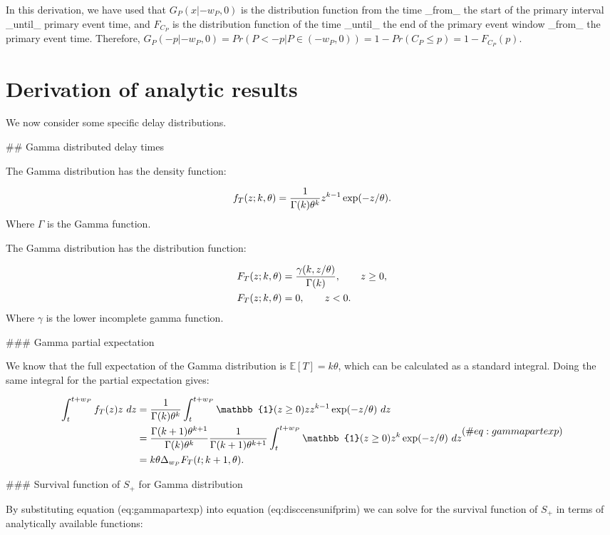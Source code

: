 \documentclass[10pt,letterpaper]{article}
\begin{document}
In this derivation, we have used that $G_P(x|-w_P, 0)$ is the distribution function from the time _from_ the start of the primary interval _until_ primary event time, and $F_{C_P}$ is the distribution function of the time _until_ the end of the primary event window _from_ the primary event time. Therefore, $G_P(-p|-w_P, 0) = Pr(P < -p | P \in (-w_P, 0)) = 1 - Pr(C_P \leq p) = 1 - F_{C_P}(p)$.

\section{Derivation of analytic results}

We now consider some specific delay distributions.

## Gamma distributed delay times

The Gamma distribution has the density function:

$$
f_T(z;k, \theta) = {1 \over \Gamma(k) \theta^k} z^{k-1} \exp(-z/\theta).
$$
Where $\Gamma$ is the Gamma function.

The Gamma distribution has the distribution function:

$$
\begin{aligned}
F_T(z;k, \theta) &= {\gamma(k, z/\theta) \over \Gamma(k)}, \qquad z\geq 0,\\
F_T(z;k, \theta) &= 0, \qquad z < 0.
\end{aligned}
$$
Where $\gamma$ is the lower incomplete gamma function.

### Gamma partial expectation

We know that the full expectation of the Gamma distribution is $\mathbb{E}[T] = k\theta$, which can be calculated as a standard integral. Doing the same integral for the partial expectation gives:

$$
\begin{aligned}
\int_t^{t+w_P} f_T(z) z~ dz &= {1 \over \Gamma(k) \theta^k} \int_t^{t+w_P} \mathbb{1}(z \geq 0)  z  z^{k-1} \exp(-z/\theta)~dz \\
&=  {\Gamma(k+1) \theta^{k+1} \over \Gamma(k) \theta^k}  {1 \over \Gamma(k+1) \theta^{k+1}} \int_t^{t+w_P} \mathbb{1}(z \geq 0)  z^{k}  \exp(-z/\theta)~dz\\
&= k\theta \Delta_{w_P} F_T(t; k + 1, \theta).
\end{aligned} (\#eq:gammapartexp)
$$

### Survival function of $S_{+}$ for Gamma distribution

By substituting equation \@ref(eq:gammapartexp) into equation \@ref(eq:disccensunifprim) we can solve for the survival function of $S_+$ in terms of analytically available functions:
\end{document}
